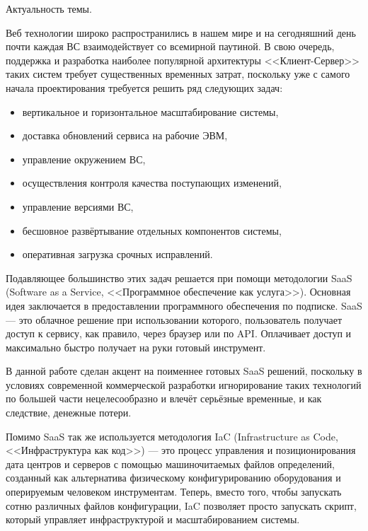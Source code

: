 \newpage

Актуальность темы.

Веб технологии широко распространились в нашем мире и на сегодняшний день почти каждая ВС взаимодействует со всемирной паутиной.
В свою очередь, поддержка и разработка наиболее популярной архитектуры <<Клиент-Сервер>> таких систем требует существенных временных затрат, поскольку уже с самого начала проектирования требуется решить ряд следующих задач:

\begin{itemize}
    \item вертикальное и горизонтальное масштабирование системы,
    \item доставка обновлений сервиса на рабочие ЭВМ,
    \item управление окружением ВС,
    \item осуществления контроля качества поступающих изменений,
    \item управление версиями ВС,
    \item бесшовное развёртывание отдельных компонентов системы,
    \item оперативная загрузка срочных исправлений.
\end{itemize}

Подавляющее большинство этих задач решается при помощи методологии SaaS (Software as a Service, <<Программное обеспечение как услуга>>).
Основная идея заключается в предоставлении программного обеспечения по подписке.
SaaS --- это облачное решение при использовании которого, пользователь получает доступ к сервису, как правило, через браузер или по API.
Оплачивает доступ и максимально быстро получает на руки готовый инструмент.

В данной работе сделан акцент на поименнее готовых SaaS решений, поскольку в условиях современной коммерческой разработки игнорирование таких
технологий по большей части нецелесообразно и влечёт серьёзные временные, и как следствие, денежные потери.

Помимо SaaS так же используется методология IaC (Infrastructure as Code, <<Инфраструктура как код>>) --- это процесс управления и позиционирования дата центров и серверов с помощью машиночитаемых файлов определений,
созданный как альтернатива физическому конфигурированию оборудования и оперируемым человеком инструментам.
Теперь, вместо того, чтобы запускать сотню различных файлов конфигурации,
IaC позволяет просто запускать скрипт, который управляет инфраструктурой и масштабированием системы.

